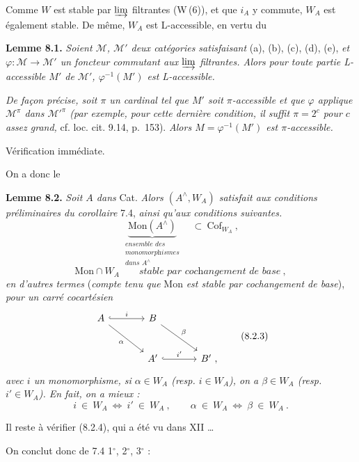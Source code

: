 \documentclass[11pt]{article}
\newcommand{\printedpage}[1]{\marginpar{\raggedright\footnotesize p.~#1}}
\newcommand{\msp}[1]{\marginpar{\raggedright\footnotesize [#1]}}
\newcommand{\Mon}{\mathrm{Mon}}
\newcommand{\Cof}{\mathrm{Cof}}
\newcommand{\chap}{^{\wedge}}
\begin{document}
Comme $W$ est stable par $\varinjlim$ filtrantes (W\,(6)), et que $i_A$ y commute, $W_A$ est également stable. De même, $W_A$ est L-accessible, en vertu du

\textbf{Lemme 8.1.} \textit{Soient $\mathcal{M}$, $\mathcal{M}'$ deux catégories satisfaisant} (a), (b), (c), (d), (e), \textit{et $\varphi:\mathcal{M}\longrightarrow\mathcal{M}'$ un foncteur commutant aux $\varinjlim$ filtrantes. Alors pour toute partie L-accessible $M'$ de $\mathcal{M}'$, $\varphi^{-1}(M')$ est L-accessible.}

\msp{page 103}
\textit{De façon précise, soit $\pi$ un cardinal tel que $M'$ soit $\pi$-accessible et que $\varphi$ applique $\mathcal{M}^{\pi}$ dans $\mathcal{M}'^{\pi}$ (par exemple, pour cette dernière condition, il suffit $\pi=2^c$ pour $c$ assez grand,} cf. loc. cit. 9.14, p.~153). \textit{Alors $M=\varphi^{-1}(M')$ est $\pi$-accessible.}

Vérification immédiate.

On a donc le

\printedpage{57}
\textbf{Lemme 8.2.} \textit{Soit $A$ dans} Cat. \textit{Alors $(A\chap,W_A)$ satisfait aux conditions préliminaires du corollaire} 7.4, \textit{ainsi qu'aux conditions suivantes.}
\[
\underbrace{\Mon(A\chap)}_{\substack{\textit{ensemble des}\\ \textit{monomorphismes}\\ \textit{dans } A\chap}} \quad\subset\ \Cof_{W_A}\ ,
\tag*{(8.2.1)}
\]
\[
\Mon\cap W_A \qquad \textit{stable par cochangement de base}\ ,
\tag*{(8.2.2)}
\]
\textit{en d'autres termes} (\textit{compte tenu que} Mon \textit{est stable par cochangement de base}), \textit{pour un carré cocartésien}
\[
\begin{tikzcd}[row sep=large, column sep=large]
A \arrow[r, hook, "i"] \arrow[dr, "\alpha"'] & B \arrow[dr, "\beta"] & \\
& A' \arrow[r, hook, "i'"] & B'\ ,
\end{tikzcd}
\tag*{(8.2.3)}
\]
\textit{avec $i$ un monomorphisme, si $\alpha\in W_A$ (resp. $i\in W_A$), on a $\beta\in W_A$ (resp. $i'\in W_A$). En fait, on a mieux :}
\[
i\ \in\ W_A \ \Longleftrightarrow\ i'\ \in\ W_A\ , \qquad \alpha\ \in\ W_A \ \Longleftrightarrow\ \beta\ \in\ W_A\ .
\tag*{(8.2.4)}
\]

\msp{page 104}
Il reste à vérifier (8.2.4), qui a été vu dans XII \ldots

On conclut donc de 7.4 1$^\circ$, 2$^\circ$, 3$^\circ$ :
\end{document}
